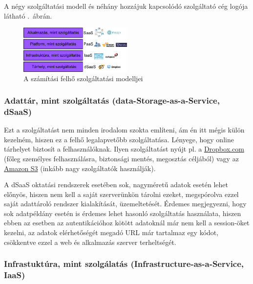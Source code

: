 A négy szolgáltatási modell és néhány hozzájuk kapcsolódó szolgáltató cég logója látható .~ábrán.

\begin{figure}[h!]
\centering
\includegraphics[width=0.5\textwidth]{figures/cloud_service_models.png}
\caption{A számítási felhő szolgáltatási modelljei \label{fig:cloud_service_models}}
\end{figure}
 
\subsubsection{Adattár, mint szolgáltatás (\foreignlanguage{english}{data-Storage-as-a-Service, dSaaS})}
Ezt a szolgáltatást nem minden irodalom szokta említeni, ám én itt mégis külön kezelném, hiszen ez a felhő legalapvetőbb szolgáltatása. Lényege, hogy online tárhelyet biztosít a felhasználóknak. Ilyen szolgáltatást nyújt pl. a \href{http://www.dropbox.com}{Dropbox.com} (főleg személyes felhasználásra, biztonsági mentés, megosztás céljából) vagy az \href{https://aws.amazon.com/s3/}{Amazon S3} (inkább nagy szolgáltatók használják).

A dSaaS oktatási rendszerek esetében sok, nagyméretű adatok esetén lehet előnyös, hiszen nem kell a saját szerverünkön tárolni ezeket, megspórolva ezzel saját adattároló rendszer kialakítását, üzemeltetését. Érdemes megjegyezni, hogy sok adatpéldány esetén is érdemes lehet hasonló szolgáltatás használata, hiszen ebben az esetben az autentikációhoz kötött adatoknál már nem kell a session-öket kezelni, az adatok elérhetőségét megadó URL már tartalmaz egy kódot, csökkentve ezzel a web és alkalmazás szerver terheltségét. 


\subsubsection{Infrastuktúra, mint szolgálatás (\foreignlanguage{english}{Infrastructure-as-a-Service, IaaS})}

